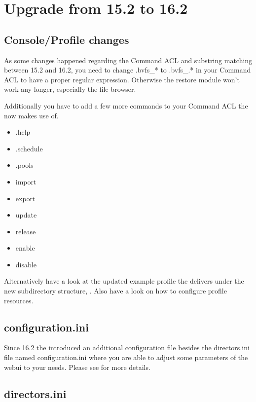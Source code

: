 \section{Upgrade from 15.2 to 16.2}

\subsection{Console/Profile changes}

As some changes happened regarding the Command ACL and substring matching between 15.2 and 16.2, you need to change .bvfs_* to .bvfs_.* in your Command ACL to have a proper regular expression. Otherwise the restore module won't work any longer, especially the file browser.

Additionally you have to add a few more commands to your Command ACL the \bareosWebui now makes use of.

\begin{itemize}
\item .help
\item .schedule
\item .pools
\item import
\item export
\item update
\item release
\item enable
\item disable
\end{itemize}

Alternatively have a look at the updated example profile the \bareosWebui delivers under the new subdirectory structure, .
Also have a look on  how to configure profile resources.

\subsection{configuration.ini}

Since 16.2 the \bareosWebui introduced an additional configuration file besides the directors.ini file named configuration.ini where you are able to adjust some parameters of the webui to your needs. Please see  for more details.

\subsection{directors.ini}

